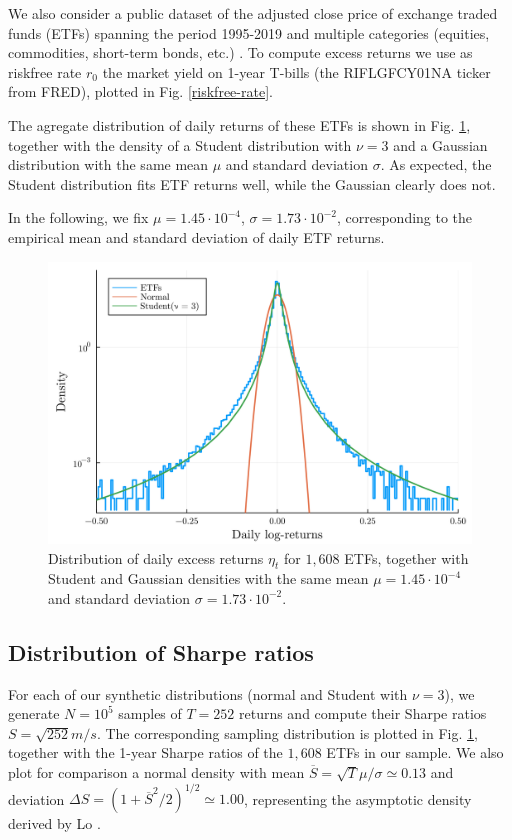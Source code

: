\documentclass[
reprint,
amsmath,amssymb,
aps,
]{revtex4-2}
\begin{document}
We also consider a public dataset of the adjusted close price of exchange traded funds (ETFs) spanning the period 1995-2019 and multiple categories (equities, commodities, short-term bonds, etc.) \cite{leoneUS}. 
To compute excess returns we use as riskfree rate $r_0$ the market yield on 1-year T-bills (the RIFLGFCY01NA ticker from FRED), plotted in Fig. \ref{riskfree-rate}. 

The agregate distribution of daily returns of these ETFs is shown in Fig. \ref{returns-dist}, together with the density of a Student distribution with $\nu =3$ and a Gaussian distribution with the same mean $\mu$ and standard deviation $\sigma$. 
As expected, the Student distribution fits ETF returns well, while the Gaussian clearly does not. 

In the following, we fix $\mu = 1.45\cdot 10^{-4}$, $\sigma = 1.73\cdot 10^{-2}$, corresponding to the empirical mean and standard deviation of daily ETF returns. 

\begin{figure}[t!]
    \includegraphics[width = .45\textwidth]{returns-dist.png}
    \caption{Distribution of daily excess returns $\eta_t$ for $1,608$ ETFs, together with Student and Gaussian densities with the same mean $\mu = 1.45\cdot 10^{-4}$ and standard deviation $\sigma = 1.73\cdot 10^{-2}$.}
    \label{returns-dist}
\end{figure}

\subsection{Distribution of Sharpe ratios}

For each of our synthetic distributions (normal and Student with $\nu =3$), we generate $N = 10^5$ samples of $T = 252$ returns and compute their Sharpe ratios $S=\sqrt{252}m/s$. 
The corresponding sampling distribution is plotted in Fig. \ref{returns-dist}, together with the 1-year Sharpe ratios of the $1,608$ ETFs in our sample. 
We also plot for comparison a normal density with mean $\overline{S} = \sqrt{T}\mu/\sigma\simeq 0.13$ and deviation $\Delta S = (1+\overline{S}^2/2)^{1/2}\simeq 1.00$, representing the asymptotic density derived by Lo \cite{loStatistics2002}. 
\end{document}
